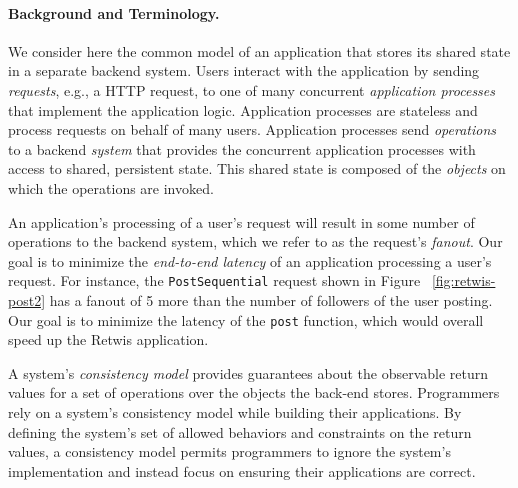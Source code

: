 \paragraph{Background and Terminology.}
We consider here the common model of an application that stores its shared state in a separate backend system.
Users interact with the application by sending \textit{requests}, e.g., a HTTP request, to one of many concurrent \textit{application processes} that implement the application logic. Application processes are stateless and process requests on behalf of many users. Application processes send \textit{operations} to a backend \textit{system} that provides the concurrent application processes with access to shared, persistent state. This shared state is composed of the \textit{objects} on which the operations are invoked.

 An application's processing of a user's request will result in some number of operations to the backend system, which we refer to as the request's \textit{fanout}. Our goal is to minimize the \textit{end-to-end latency} of an application processing a user's request. For instance, the \texttt{PostSequential} request shown in Figure ~\ref{fig:retwis-post2} has a fanout of 5 more than the number of followers of the user posting. Our goal is to minimize the latency of the \texttt{post} function, which would overall speed up the Retwis application.

A system's \textit{consistency model} provides guarantees about the observable return values for a set of operations over the objects the back-end stores.
Programmers rely on a system's consistency model while building their applications. By defining the system's set of allowed behaviors and constraints on the return values, a consistency model permits programmers to ignore the system's implementation and instead focus on ensuring their applications are correct.


